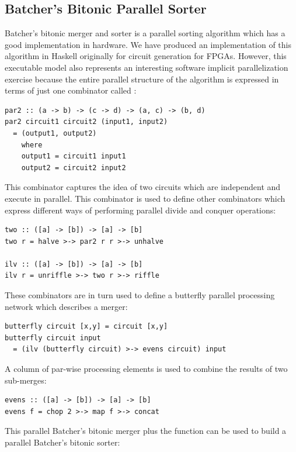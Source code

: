 \subsection{Batcher's Bitonic Parallel Sorter}
Batcher's bitonic merger and sorter is a parallel sorting algorithm which has a good implementation in hardware. We have produced an implementation of this algorithm in Haskell originally for circuit generation for FPGAs. However, this executable model also represents an interesting software implicit parallelization exercise because the entire parallel structure of the algorithm is expressed in terms of just one combinator called :

\begin{lstlisting}
par2 :: (a -> b) -> (c -> d) -> (a, c) -> (b, d)
par2 circuit1 circuit2 (input1, input2)
  = (output1, output2)
    where
    output1 = circuit1 input1
    output2 = circuit2 input2
\end{lstlisting}

This combinator captures the idea of two circuits which are independent and execute in parallel. This combinator is used to define other combinators which express different ways of performing parallel divide and conquer operations:

\begin{lstlisting}
two :: ([a] -> [b]) -> [a] -> [b]
two r = halve >-> par2 r r >-> unhalve

ilv :: ([a] -> [b]) -> [a] -> [b]
ilv r = unriffle >-> two r >-> riffle
\end{lstlisting}

These combinators are in turn used to define a butterfly parallel processing network which describes a merger:

\begin{lstlisting}
butterfly circuit [x,y] = circuit [x,y]
butterfly circuit input
  = (ilv (butterfly circuit) >-> evens circuit) input
\end{lstlisting}

A column of par-wise processing elements is used to combine the results of two sub-merges:

\begin{lstlisting}
evens :: ([a] -> [b]) -> [a] -> [b]
evens f = chop 2 >-> map f >-> concat
\end{lstlisting}

This parallel Batcher's bitonic merger plus the  function can be used to build a parallel Batcher's bitonic sorter:

